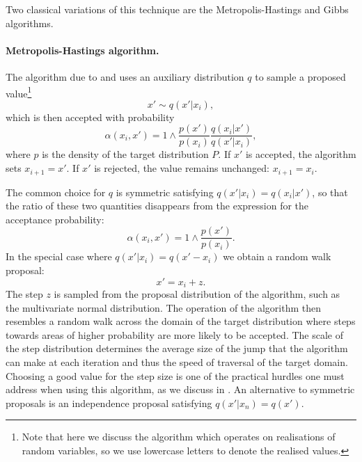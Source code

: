 \documentclass[11pt,a4paper]{report}
\begin{document}
Two classical variations of this technique are the Metropolis-Hastings and Gibbs algorithms.

\paragraph{Metropolis-Hastings algorithm.} The algorithm due to \cite{metropolisEquationStateCalculations1953} and \cite{hastingsMonteCarloSampling1970} uses an auxiliary distribution $q$ to sample a proposed value\footnote{Note that here we discuss the algorithm which operates on realisations of random variables, so we use lowercase letters to denote the realised values.}
$$x' \sim q(x' | x_i),$$
which is then accepted with probability
$$\alpha(x_i, x') = 1 \wedge \frac{p(x')}{p(x_i)} \frac{q(x_i|x')}{q(x'|x_i)},$$
where $p$ is the density of the target distribution $P$.
If $x'$ is accepted, the algorithm sets $x_{i+1} = x'$. If $x'$ is rejected, the value remains unchanged: $x_{i+1} = x_i$.

The common choice for $q$ is symmetric satisfying $q(x'|x_i) = q(x_i|x')$, so that the ratio of these two quantities disappears from the expression for the acceptance probability:
$$\alpha(x_i, x') = 1 \wedge \frac{p(x')}{p(x_i)}.$$
In the special case where $q(x'|x_i) = q(x' - x_i)$ we obtain a random walk proposal:
$$x' = x_i + z.$$
The step $z$ is sampled from the proposal distribution of the algorithm, such as the multivariate normal distribution. The operation of the algorithm then resembles a random walk across the domain of the target distribution where steps towards areas of higher probability are more likely to be accepted. The scale of the step distribution determines the average size of the jump that the algorithm can make at each iteration and thus the speed of traversal of the target domain. Choosing a good value for the step size is one of the practical hurdles one must address when using this algorithm, as we discuss in . An alternative to symmetric proposals is an independence proposal satisfying $q(x'|x_n) = q(x')$.
\end{document}
